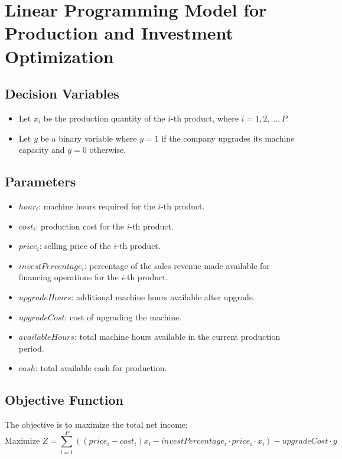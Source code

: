\documentclass{article}
\begin{document}
\section*{Linear Programming Model for Production and Investment Optimization}

\subsection*{Decision Variables}
\begin{itemize}
    \item Let $x_i$ be the production quantity of the $i$-th product, where $i = 1, 2, \ldots, P$.
    \item Let $y$ be a binary variable where $y = 1$ if the company upgrades its machine capacity and $y = 0$ otherwise.
\end{itemize}

\subsection*{Parameters}
\begin{itemize}
    \item $hour_i$: machine hours required for the $i$-th product.
    \item $cost_i$: production cost for the $i$-th product.
    \item $price_i$: selling price of the $i$-th product.
    \item $investPercentage_i$: percentage of the sales revenue made available for financing operations for the $i$-th product.
    \item $upgradeHours$: additional machine hours available after upgrade.
    \item $upgradeCost$: cost of upgrading the machine.
    \item $availableHours$: total machine hours available in the current production period.
    \item $cash$: total available cash for production.
\end{itemize}

\subsection*{Objective Function}
The objective is to maximize the total net income:
\[
\text{Maximize } Z = \sum_{i=1}^{P} \left( (price_i - cost_i) x_i - investPercentage_i \cdot price_i \cdot x_i \right) - upgradeCost \cdot y
\]
\end{document}
